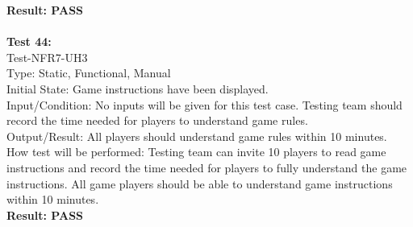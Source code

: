 \documentclass[12pt, titlepage]{article}
\begin{document}
\textbf{Result: PASS}\\\\
\textbf{Test 44:}\\
Test-NFR7-UH3\\
Type: Static, Functional, Manual\\
Initial State: Game instructions have been displayed.\\
Input/Condition: No inputs will be given for this test
case. Testing team should record the time needed for 
players to understand game rules.\\
Output/Result: All players should understand game rules
within 10 minutes.\\
How test will be performed:  Testing team can invite
10 players to read game instructions and record the time needed for players to fully understand the game instructions.
All game players should be able to understand game 
instructions within 10 minutes.\\
\textbf{Result: PASS}\\\\
\end{document}
